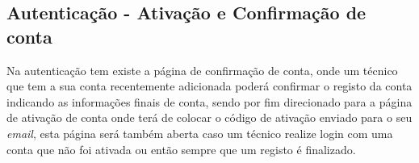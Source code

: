 \newpage

\subsection{Autenticação - Ativação e Confirmação de conta}

Na autenticação tem existe a página de confirmação de conta, onde um técnico que tem a sua conta recentemente adicionada poderá
confirmar o registo da conta indicando as informações finais de conta, sendo por fim direcionado para a página
de ativação de conta onde terá de colocar o código de ativação enviado para o seu \textit{email}, esta página será também aberta 
caso um técnico realize login com uma conta que não foi ativada ou então sempre que um registo é finalizado.

\begin{figure}[htb]%
    \centering
    \qquad

\end{figure}
